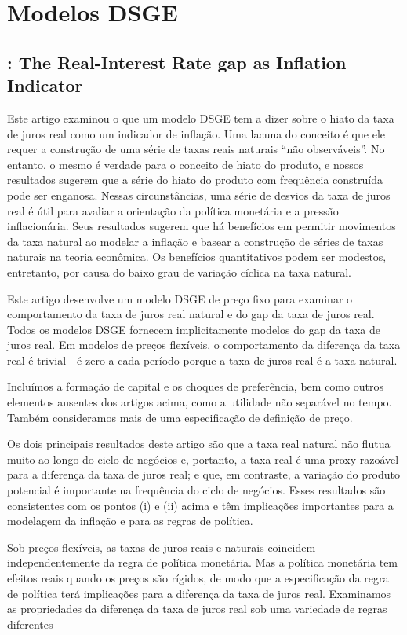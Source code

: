\chapter{Modelos DSGE}
%
%
\section{\citet{Neiss:2003}: The Real-Interest Rate gap as Inflation Indicator}
Este artigo examinou o que um modelo DSGE tem a dizer sobre o hiato da taxa de juros real como um indicador de inflação. Uma lacuna do conceito é que ele requer a construção de uma série de taxas reais naturais “não observáveis”. No entanto, o mesmo é verdade para o conceito de hiato do produto, e nossos resultados sugerem que a série do hiato do produto com frequência construída pode ser enganosa. Nessas circunstâncias, uma série de desvios da taxa de juros real é útil para avaliar a orientação da política monetária e a pressão inflacionária. Seus resultados sugerem que há benefícios em permitir movimentos da taxa natural ao modelar a inflação e basear a construção de séries de taxas naturais na teoria econômica. Os benefícios quantitativos podem ser modestos, entretanto, por causa do baixo grau de variação cíclica na taxa natural.

Este artigo desenvolve um modelo DSGE de preço fixo para examinar o comportamento da taxa de juros real natural e do gap da taxa de juros real. Todos os modelos DSGE fornecem implicitamente modelos do gap da taxa de juros real. Em modelos de preços flexíveis, o comportamento da diferença da taxa real é trivial - é zero a cada período porque a taxa de juros real é a taxa natural.

Incluímos a formação de capital e os choques de preferência, bem como outros elementos ausentes dos artigos acima, como a utilidade não separável no tempo. Também consideramos mais de uma especificação de definição de preço.

Os dois principais resultados deste artigo são que a taxa real natural não flutua muito ao longo do ciclo de negócios e, portanto, a taxa real é uma proxy razoável para a diferença da taxa de juros real; e que, em contraste, a variação do produto potencial é importante na frequência do ciclo de negócios. Esses resultados são consistentes com os pontos (i) e (ii) acima e têm implicações importantes para a modelagem da inflação e para as regras de política.

Sob preços flexíveis, as taxas de juros reais e naturais coincidem independentemente da regra de política monetária. Mas a política monetária tem efeitos reais quando os preços são rígidos, de modo que a especificação da regra de política terá implicações para a diferença da taxa de juros real. Examinamos as propriedades da diferença da taxa de juros real sob uma variedade de regras diferentes

